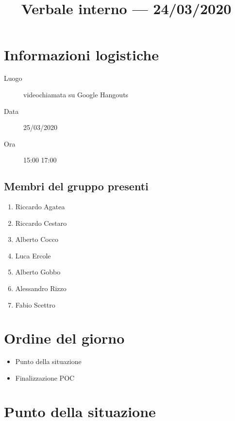 \documentclass{article}
\title{Verbale interno --- 24/03/2020}
\begin{document}


\section{Informazioni logistiche}%
\label{sec:informazioni_logistiche}

\begin{description}
  \item [Luogo] videochiamata su Google Hangouts
  \item [Data] 25/03/2020
  \item [Ora] 15:00  17:00
\end{description}

\subsection{Membri del gruppo presenti}%
\label{sub:membri_del_gruppo_presenti}

\begin{enumerate}
  \item Riccardo Agatea
  \item Riccardo Cestaro
  \item Alberto Cocco
  \item Luca Ercole
  \item Alberto Gobbo
  \item Alessandro Rizzo
  \item Fabio Scettro
\end{enumerate}

\section{Ordine del giorno}%
\label{sec:ordine_del_giorno}

\begin{itemize}
  \item Punto della situazione
  \item Finalizzazione POC
\end{itemize}

\section{Punto della situazione}%
\label{sec:punto_della_situazione}
\end{document}
